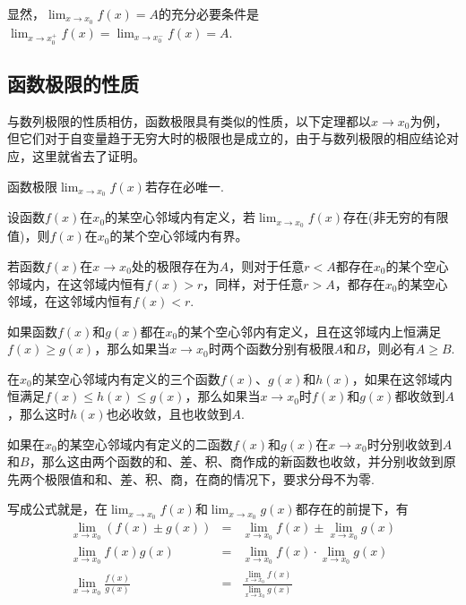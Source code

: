   显然，$\lim_{x \to x_0} f(x) = A$的充分必要条件是 $\lim_{x \to x_0^+} f(x) = \lim_{x \to x_0^-} f(x) = A$.

  \subsection{函数极限的性质}
\label{sec:properties-of-function-limit}


与数列极限的性质相仿，函数极限具有类似的性质，以下定理都以$x\to x_0$为例，但它们对于自变量趋于无穷大时的极限也是成立的，由于与数列极限的相应结论对应，这里就省去了证明。

\begin{property}[唯一性]
  函数极限$\lim_{x \to x_0}f(x)$若存在必唯一.
\end{property}

\begin{theorem}[局部有界性]
  设函数$f(x)$在$x_0$的某空心邻域内有定义，若$\lim_{x \to x_0}f(x)$存在(非无穷的有限值)，则$f(x)$在$x_0$的某个空心邻域内有界。
\end{theorem}

\begin{theorem}[局部保号性]
  若函数$f(x)$在$x \to x_0$处的极限存在为$A$，则对于任意$r<A$都存在$x_0$的某个空心邻域内，在这邻域内恒有$f(x)>r$，同样，对于任意$r>A$，都存在$x_0$的某空心邻域，在这邻域内恒有$f(x)<r$.
\end{theorem}

\begin{theorem}[保不等式性]
 如果函数$f(x)$和$g(x)$都在$x_0$的某个空心邻内有定义，且在这邻域内上恒满足$f(x) \geqslant g(x)$，那么如果当$x \to x_0$时两个函数分别有极限$A$和$B$，则必有$A \geqslant B$.
\end{theorem}

\begin{theorem}[夹逼定理]
  在$x_0$的某空心邻域内有定义的三个函数$f(x)$、$g(x)$和$h(x)$，如果在这邻域内恒满足$f(x) \leqslant h(x) \leqslant g(x)$，那么如果当$x \to x_0$时$f(x)$和$g(x)$都收敛到$A$，那么这时$h(x)$也必收敛，且也收敛到$A$.
\end{theorem}

\begin{theorem}[四则运算法则]
  如果在$x_0$的某空心邻域内有定义的二函数$f(x)$和$g(x)$在$x \to x_0$时分别收敛到$A$和$B$，那么这由两个函数的和、差、积、商作成的新函数也收敛，并分别收敛到原先两个极限值和和、差、积、商，在商的情况下，要求分母不为零.
\end{theorem}

写成公式就是，在$\lim_{x \to x_0} f(x)$和$\lim_{x \to x_0}g(x)$都存在的前提下，有
\begin{eqnarray*}
  \lim_{x \to x_0} (f(x) \pm g(x)) & = & \lim_{x \to x_0} f(x) \pm \lim_{x \to x_0} g(x)  \\
  \lim_{x \to x_0} f(x)g(x) & = & \lim_{x \to x_0} f(x) \cdot \lim_{x \to x_0} g(x)  \\
  \lim_{x \to x_0} \frac{f(x)}{g(x)} & = & \frac{\lim_{x \to x_0} f(x)}{\lim_{x \to x_0} g(x)}  
\end{eqnarray*}


